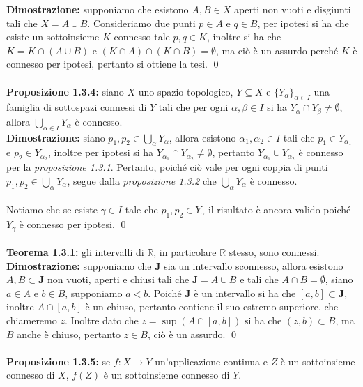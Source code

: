 \documentclass{article}
\begin{document}
\textbf{Dimostrazione:} supponiamo che esistono $A, B \in X$ aperti non vuoti e disgiunti tali che $X = A \cup B$. Consideriamo due punti $p \in A$ e $q \in B$, per ipotesi si ha che esiste un sottoinsieme $K$ connesso tale $p, q \in K$, inoltre si ha che $K = K \cap (A \cup B)$ e $(K \cap A) \cap (K \cap B) = \emptyset$, ma ciò è un assurdo perché $K$ è connesso per ipotesi, pertanto si ottiene la tesi. \qed \\ \\
\textbf{Proposizione 1.3.4:} siano $X$ uno spazio topologico, $Y \subseteq X$ e $\{ Y_\alpha \}_{\alpha \in I}$ una famiglia di sottospazi connessi di $Y$ tali che per ogni $\alpha, \beta \in I$ si ha $Y_\alpha \cap Y_\beta \neq \emptyset$, allora $\bigcup_{\alpha \in I} Y_\alpha$ è connesso. \\

\textbf{Dimostrazione:} siano $p_1, p_2 \in \bigcup_\alpha Y_\alpha$, allora esistono $\alpha_1, \alpha_2 \in I$ tali che $p_1 \in Y_{\alpha_1}$ e $p_2 \in Y_{\alpha_2}$, inoltre per ipotesi si ha $Y_{\alpha_1} \cap Y_{\alpha_2} \neq \emptyset$, pertanto $Y_{\alpha_1} \cup Y_{\alpha_2}$ è connesso per la \textit{proposizione 1.3.1}. Pertanto, poiché ciò vale per ogni coppia di punti $p_1, p_2 \in \bigcup_\alpha Y_\alpha$, segue dalla \textit{proposizione 1.3.2} che $\bigcup_\alpha Y_\alpha$ è connesso. \\ \\
Notiamo che se esiste $\gamma \in I$ tale che $p_1, p_2 \in Y_\gamma$ il risultato è ancora valido poiché $Y_\gamma$ è connesso per ipotesi. \qed \\ \\
\textbf{Teorema 1.3.1:} gli intervalli di $\mathbb{R}$, in particolare $\mathbb{R}$ stesso, sono connessi. \\

\textbf{Dimostrazione:} supponiamo che $\mathbf{J}$ sia un intervallo sconnesso, allora esistono $A, B \subset \mathbf{J}$ non vuoti, aperti e chiusi tali che $\mathbf{J} = A \cup B$ e tali che $A \cap B = \emptyset$, siano $a \in A$ e $b \in B$, supponiamo $a < b$. Poiché $\mathbf{J}$ è un intervallo si ha che $[a, b] \subset \mathbf{J}$, inoltre $A \cap [a, b]$ è un chiuso, pertanto contiene il suo estremo superiore, che chiameremo $z$. Inoltre dato che $z = \sup (A \cap [a, b])$ si ha che $(z, b) \subset B$, ma $B$ anche è chiuso, pertanto $z \in B$, ciò è un assurdo. \qed \\ \\
\textbf{Proposizione 1.3.5:} se $f : X \longrightarrow Y$ un'applicazione continua e $Z$ è un sottoinsieme connesso di $X$, $f(Z)$ è un sottoinsieme connesso di $Y$. \\
\end{document}
